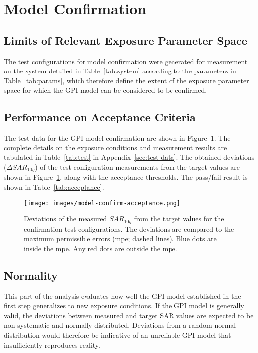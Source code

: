 \documentclass{article}
\begin{document}
\section{Model Confirmation}

\subsection{Limits of Relevant Exposure Parameter Space}
The test configurations for model confirmation were generated for measurement on the system detailed in Table~\ref{tab:system} according to the parameters in Table~\ref{tab:params}, which therefore define the extent of the exposure parameter space for which the GPI model can be considered to be confirmed.



\FloatBarrier
\subsection{Performance on Acceptance Criteria}
The test data for the GPI model confirmation are shown in Figure~\ref{fig:confirm-acc}. The complete details on the exposure conditions and measurement results are tabulated in Table~\ref{tab:test} in Appendix~\ref{sec:test-data}.
The obtained deviations ($\Delta SAR_{10g}$) of the test configuration measurements from the target values are shown in Figure~\ref{fig:confirm-acc}, along with the acceptance thresholds. The pass/fail result is shown in Table~\ref{tab:acceptance}.



\begin{figure}[H] \centering
\texttt{[image: images/model-confirm-acceptance.png]}
\caption{Deviations of the measured $SAR_{10g}$ from the target values for the confirmation test configurations. The deviations are compared to the maximum permissible errors (mpe; dashed lines). Blue dots are inside the mpe. Any red dots are outside the mpe.} \label{fig:confirm-acc}
\end{figure}

\FloatBarrier
\subsection{Normality}

This part of the analysis evaluates how well the GPI model established in the first step generalizes to new exposure conditions. If the GPI model is generally valid, the deviations between measured and target SAR values are expected to be non-systematic and normally distributed. Deviations from a random normal distribution would therefore be indicative of an unreliable GPI model that insufficiently reproduces reality.
\end{document}
